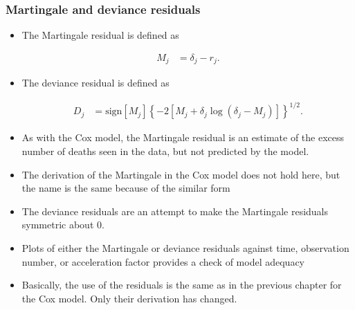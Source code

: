 \documentclass[10pt]{article}\usepackage[]{graphicx}\usepackage[]{xcolor}
\theoremstyle{definition}
\numberwithin{equation}{subsection}
\numberwithin{figure}{section}
\numberwithin{table}{subsection}
\numberwithin{Report}{section}
\numberwithin{Example}{subsection}
\begin{document}
\subsubsection{Martingale and deviance residuals}
\begin{itemize}
\item The Martingale residual is defined as


\begin{align*}
M_{j} & =\delta_{j}-r_{j}.
\end{align*}


\item The deviance residual is defined as


\begin{align*}
D_{j} & =\mbox{sign}[M_{j}]\left\{ -2\left[M_{j}+\delta_{j}\log(\delta_{j}-M_{j})\right]\right\} ^{1/2}.
\end{align*}


\item As with the Cox model, the Martingale residual is an estimate of the
excess number of deaths seen in the data, but not predicted by the
model.
\item The derivation of the Martingale in the Cox model does not hold here,
but the name is the same because of the similar form
\item The deviance residuals are an attempt to make the Martingale residuals
symmetric about $0$.
\item Plots of either the Martingale or deviance residuals against time,
observation number, or acceleration factor provides a check of model
adequacy
\item Basically, the use of the residuals is the same as in the previous
chapter for the Cox model. Only their derivation has changed.\end{itemize}
\end{document}
